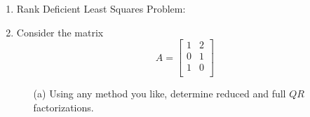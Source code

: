 \documentclass[11pt]{article}
\begin{document}
\begin{enumerate}
        \begin{proof}
            Let $A \in \CC^{m \times m}$ be nonsingular.
            Suppose that $A$ has an $LU$ factorization.
            It is known that $\det(A) = \det(L)\times\det(U)$.
            Since $L$ and $U$ are triangular the deteminants of $L$ and $U$ are
            the product of the entries along the diagonal.
            Since the diagonal of $L$ is all ones, $\det(L) = 1$.
            Therefore $\det(A) = \det(U)$.
            Since $A$ is nonsingular, $\det(A) \neq 0$.
            This implies that all of the diagonal entries of $U$ are nonzero.
            Also note that $A(1:k, 1:k) = L(1:k, 1:k) U(1:k, 1:k)$ for $1 \le k \le m$, so
            $\det(A(1:k, 1:k)) = \det(L(1:k, 1:k)) \det(U(1:k, 1:k))$.
            As before $\det(L(1:k, 1:k)) = 1$.
            Since all of the diagonal entries of $U$ are nonzero
            $\det(U(1:k,1:k)) \neq 0$.
            This implies that $\det(A(1:k, 1:k)) \neq 0$ and thus $A(1:k, 1:k)$
            is nonsingular.

            Now suppose that $A(1:k, 1:k)$ is nonsingular for $1 \le k \le m$.

        \end{proof}

    \item %
        Rank Deficient Least Squares Problem:

    \item %
        Consider the matrix
        \[
            A =
            \begin{bmatrix}
                1 & 2 \\
                0 & 1 \\
                1 & 0 \\
            \end{bmatrix}
        \]
        \begin{enumerate}
            \item[(a)] %
                Using any method you like, determine reduced and full $QR$
                factorizations.


\end{enumerate}
\end{enumerate}
\end{document}
